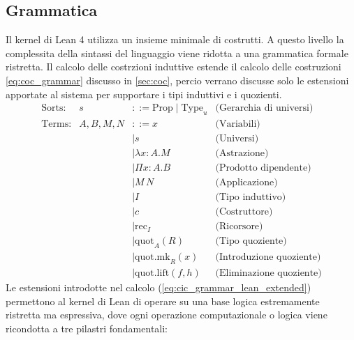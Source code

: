 \subsection{Grammatica}
Il kernel di Lean 4 utilizza un insieme minimale di costrutti. A questo livello la complessita della sintassi del linguaggio viene ridotta a una 
grammatica formale ristretta. Il calcolo delle costrzioni induttive estende il calcolo delle costruzioni \ref{eq:coc_grammar} discusso in \ref{sec:coc},
percio verrano discusse solo le estensioni apportate al sistema per supportare i tipi induttivi e i quozienti.
\begin{equation}
    \begin{array}{lrll}
        \text{Sorts:}   & s          & ::= \text{Prop} \mid \text{Type}_u      & \text{(Gerarchia di universi)}  \\
        \text{Terms:}   & A, B, M, N & ::= x                                   & \text{(Variabili)}              \\
                        &            & \mid s                                  & \text{(Universi)}               \\
                        &            & \mid \lambda x : A. M                   & \text{(Astrazione)}             \\
                        &            & \mid \Pi x : A. B                       & \text{(Prodotto dipendente)}    \\
                        &            & \mid M \, N                             & \text{(Applicazione)}           \\
                        &            & \mid I                                  & \text{(Tipo induttivo)}         \\
                        &            & \mid c                                  & \text{(Costruttore)}            \\
                        &            & \mid \text{rec}_I                       & \text{(Ricorsore)}              \\
                        &            & \mid \text{quot}_A(R)                   & \text{(Tipo quoziente)}         \\
                        &            & \mid \text{quot.mk}_R(x)                & \text{(Introduzione quoziente)} \\
                        &            & \mid \text{quot.lift}(f, h)             & \text{(Eliminazione quoziente)}
    \end{array} 
    \tag{CiC}
    \label{eq:cic_grammar_lean_extended}
\end{equation}
Le estensioni introdotte nel calcolo (\ref{eq:cic_grammar_lean_extended}) permettono al kernel di Lean di operare su una base logica estremamente 
ristretta ma espressiva, dove ogni operazione computazionale o logica viene ricondotta a tre pilastri fondamentali:

